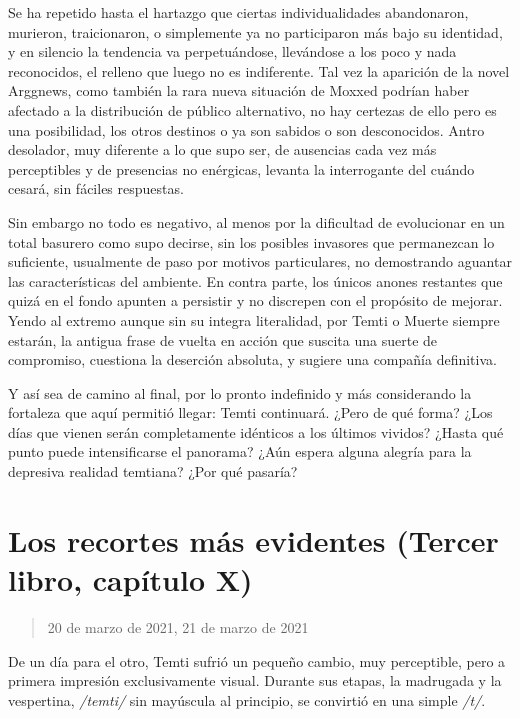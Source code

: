 \documentclass[
]{book}
\begin{document}
Se ha repetido hasta el hartazgo que ciertas individualidades abandonaron, murieron, traicionaron, o simplemente ya no participaron más bajo su identidad, y en silencio la tendencia va perpetuándose, llevándose a los poco y nada reconocidos, el relleno que luego no es indiferente. Tal vez la aparición de la novel Arggnews, como también la rara nueva situación de Moxxed podrían haber afectado a la distribución de público alternativo, no hay certezas de ello pero es una posibilidad, los otros destinos o ya son sabidos o son desconocidos. Antro desolador, muy diferente a lo que supo ser, de ausencias cada vez más perceptibles y de presencias no enérgicas, levanta la interrogante del cuándo cesará, sin fáciles respuestas.

Sin embargo no todo es negativo, al menos por la dificultad de evolucionar en un total basurero como supo decirse, sin los posibles invasores que permanezcan lo suficiente, usualmente de paso por motivos particulares, no demostrando aguantar las características del ambiente. En contra parte, los únicos anones restantes que quizá en el fondo apunten a persistir y no discrepen con el propósito de mejorar. Yendo al extremo aunque sin su integra literalidad, por Temti o Muerte siempre estarán, la antigua frase de vuelta en acción que suscita una suerte de compromiso, cuestiona la deserción absoluta, y sugiere una compañía definitiva.

Y así sea de camino al final, por lo pronto indefinido y más considerando la fortaleza que aquí permitió llegar: Temti continuará. ¿Pero de qué forma? ¿Los días que vienen serán completamente idénticos a los últimos vividos? ¿Hasta qué punto puede intensificarse el panorama? ¿Aún espera alguna alegría para la depresiva realidad temtiana? ¿Por qué pasaría?

\hypertarget{los-recortes-muxe1s-evidentes-tercer-libro-capuxedtulo-x}{%
\section{Los recortes más evidentes (Tercer libro, capítulo X)}\label{los-recortes-muxe1s-evidentes-tercer-libro-capuxedtulo-x}}

\begin{quote}
20 de marzo de 2021, 21 de marzo de 2021
\end{quote}

De un día para el otro, Temti sufrió un pequeño cambio, muy perceptible, pero a primera impresión exclusivamente visual. Durante sus etapas, la madrugada y la vespertina, \emph{/temti/} sin mayúscula al principio, se convirtió en una simple \emph{/t/}.
\end{document}
